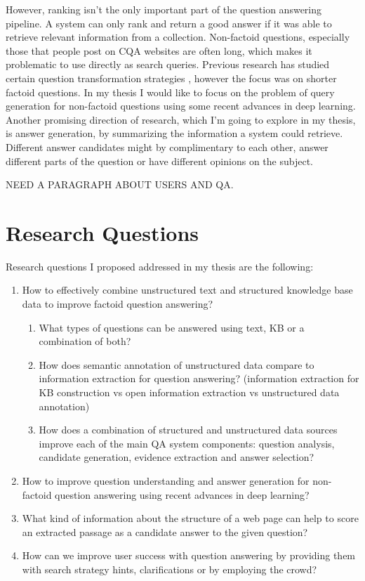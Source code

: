 However, ranking isn't the only important part of the question answering pipeline.
A system can only rank and return a good answer if it was able to retrieve relevant information from a collection.
Non-factoid questions, especially those that people post on CQA websites are often long, which makes it problematic to use directly as search queries.
Previous research has studied certain question transformation strategies \cite{AgichteinLG01,brill_askmsr,lin2003question}, however the focus was on shorter factoid questions.
In my thesis I would like to focus on the problem of query generation for non-factoid questions using some recent advances in deep learning.
Another promising direction of research, which I'm going to explore in my thesis, is answer generation, \ie by summarizing the information a system could retrieve.
Different answer candidates might by complimentary to each other, answer different parts of the question or have different opinions on the subject.

NEED A PARAGRAPH ABOUT USERS AND QA.

\section{Research Questions}

Research questions I proposed addressed in my thesis are the following:

\begin{enumerate}
\item How to effectively combine unstructured text and structured knowledge base data to improve factoid question answering?
\begin{enumerate}
  \item What types of questions can be answered using text, KB or a combination of both?
  \item How does semantic annotation of unstructured data compare to information extraction for question answering?
     (information extraction for KB construction vs open information extraction vs unstructured data annotation)
  \item How does a combination of structured and unstructured data sources improve each of the main QA system components: question analysis, candidate generation, evidence extraction and answer selection?
\end{enumerate}
\item How to improve question understanding and answer generation for non-factoid question answering using recent advances in deep learning?
\item What kind of information about the structure of a web page can help to score an extracted passage as a candidate answer to the given question?
\item How can we improve user success with question answering by providing them with search strategy hints, clarifications or by employing the crowd?
\end{enumerate}


